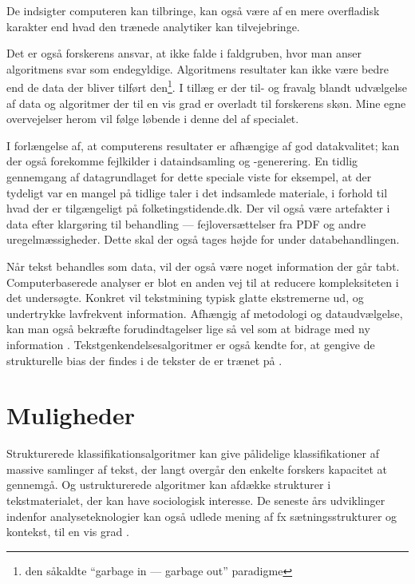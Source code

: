 De indsigter computeren kan tilbringe, kan også være af en mere overfladisk karakter end hvad den trænede analytiker kan tilvejebringe.

Det er også forskerens ansvar, at ikke falde i faldgruben, hvor man anser algoritmens svar som endegyldige.
Algoritmens resultater kan ikke være bedre end de data der bliver tilført den\footnote{den såkaldte “garbage in — garbage out” paradigme}.
I tillæg er der til- og fravalg blandt udvælgelse af data og algoritmer der til en vis grad er overladt til forskerens skøn.
Mine egne overvejelser herom vil følge løbende i denne del af specialet.

I forlængelse af, at computerens resultater er afhængige af god datakvalitet; kan der også forekomme fejlkilder i dataindsamling og -generering.
En tidlig gennemgang af datagrundlaget for dette speciale viste for eksempel, at der tydeligt var en mangel på tidlige taler i det indsamlede materiale, i forhold til hvad der er tilgængeligt på folketingstidende.dk.
Der vil også være artefakter i data efter klargøring til behandling --- fejloversættelser fra PDF og andre uregelmæssigheder.
Dette skal der også tages højde for under databehandlingen.

Når tekst behandles som data, vil der også være noget information der går tabt.
Computerbaserede analyser er blot en anden vej til at reducere kompleksiteten i det undersøgte.
Konkret vil tekstmining typisk glatte ekstremerne ud, og undertrykke lavfrekvent information.
Afhængig af metodologi og dataudvælgelse, kan man også bekræfte forudindtagelser lige så vel som at bidrage med ny information \autocite[s. 15]{kwartlerTextMiningPractice2017}.
Tekstgenkendelsesalgoritmer er også kendte for, at gengive de strukturelle bias der findes i de tekster de er trænet på \autocite{kiritchenkoExaminingGenderRace2018}.

\section{Muligheder}

Strukturerede klassifikationsalgoritmer kan give pålidelige klassifikationer af massive samlinger af tekst, der langt overgår den enkelte forskers kapacitet at gennemgå.
Og ustrukturerede algoritmer kan afdække strukturer i tekstmaterialet, der kan have sociologisk interesse.
De seneste års udviklinger indenfor analyseteknologier kan også udlede mening af fx sætningsstrukturer og kontekst, til en vis grad
\autocite[s. 22]{evansMachineTranslationMining2016}.

